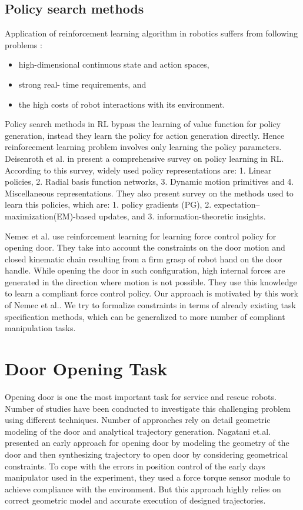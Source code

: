 \documentclass[thesis]{mas_proposal}
\begin{document}
\subsection{Policy search methods}
Application of reinforcement learning algorithm in robotics suffers from following problems \cite{deisenroth2013survey}:
\begin{itemize}
	\item high-dimensional continuous state and action spaces, 
	\item strong real- time requirements, and 
	\item the high costs of robot interactions with its environment.
\end{itemize} 
Policy search methods in RL bypass the learning of value function for policy generation, instead they learn the policy for action generation directly. Hence reinforcement learning problem involves only learning the policy parameters. Deisenroth et al. in \cite{deisenroth2013survey} present a comprehensive survey on policy learning in RL. According to this survey, widely used policy representations are: 1. Linear policies, 2. Radial basis function networks, 3. Dynamic motion primitives and 4. Miscellaneous representations. They also present survey on the methods used to learn this policies, which are: 1. policy gradients (PG), 2. expectation–maximization(EM)-based updates, and 3. information-theoretic insights.

Nemec et al. use reinforcement learning for learning force control policy for opening door\cite{nemec2017door}. They take into account the constraints on the door motion and closed kinematic chain resulting from a firm grasp of robot hand on the door handle. While opening the door in such configuration, high internal forces are generated in the direction where motion is not possible. They use this knowledge to learn a compliant force control policy. Our approach is motivated by this work of Nemec et al.\cite{nemec2017door}. We try to formalize constraints in terms of already existing task specification methods, which can be generalized to more number of compliant manipulation tasks. 

\section{Door Opening Task}

Opening door is one the most important task for service and rescue robots. Number of studies have been conducted to investigate this challenging problem using different techniques. Number of approaches rely on detail geometric modeling of the door and analytical trajectory generation. Nagatani et.al. \cite{nagatani1995experiment} presented an early approach for opening door by modeling the geometry of the door and then synthesizing trajectory to open door by considering geometrical constraints. To cope with the errors in position control of the early days manipulator used in the experiment, they used a force torque sensor module to achieve compliance with the environment. But this approach highly relies on correct geometric model and accurate execution of designed trajectories.
\end{document}
